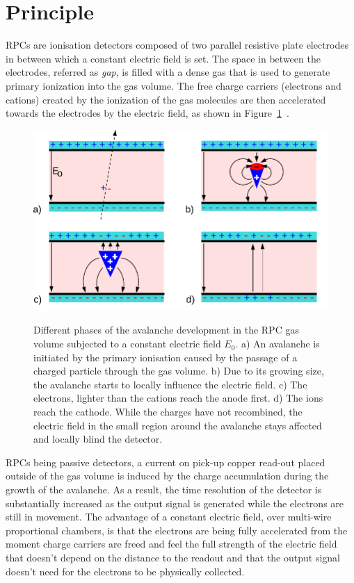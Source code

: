 \section{Principle}
\label{chapt3:sec:principle}

	RPCs are ionisation detectors composed of two parallel resistive plate electrodes in between which a constant electric field is set. The space in between the electrodes, referred as \textit{gap}, is filled with a dense gas that is used to generate primary ionization into the gas volume. The free charge carriers (electrons and cations) created by the ionization of the gas molecules are then accelerated towards the electrodes by the electric field, as shown in Figure~\ref{fig:RPC_principle}~\cite{LIPPMANN2003}.
	
	\begin{figure}[H]
		\centering
		\includegraphics[width = \plotwidth]{fig/chapt3/RPC_principle.pdf}\\
		\caption{\label{fig:RPC_principle} Different phases of the avalanche development in the RPC gas volume subjected to a constant electric field $E_0$. a) An avalanche is initiated by the primary ionisation caused by the passage of a charged particle through the gas volume. b) Due to its growing size, the avalanche starts to locally influence the electric field. c) The electrons, lighter than the cations reach the anode first. d) The ions reach the cathode. While the charges have not recombined, the electric field in the small region around the avalanche stays affected and locally blind the detector.}
	\end{figure}
	
	RPCs being passive detectors, a current on pick-up copper read-out placed outside of the gas volume is induced by the charge accumulation during the growth of the avalanche. As a result, the time resolution of the detector is substantially increased as the output signal is generated while the electrons are still in movement. The advantage of a constant electric field, over multi-wire proportional chambers, is that the electrons are being fully accelerated from the moment charge carriers are freed and feel the full strength of the electric field that doesn't depend on the distance to the readout and that the output signal doesn't need for the electrons to be physically collected.
	
